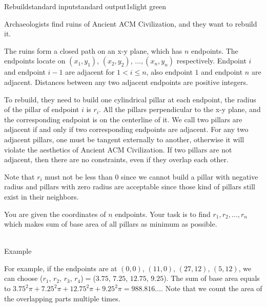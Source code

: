 \begin{problem}{Rebuild}{standard input}{standard output}{1s}{light green}

Archaeologists find ruins of Ancient ACM Civilization, and they want to rebuild it.

The ruins form a closed path on an x-y plane, which has $n$ endpoints.
The endpoints locate on $(x_1,y_1)$, $(x_2,y_2)$, $\ldots,(x_n,y_n)$ respectively.
Endpoint $i$ and endpoint $i-1$ are adjacent for $1<i\leq n$, also endpoint $1$ and endpoint $n$ are adjacent.
Distances between any two adjacent endpoints are positive integers.

To rebuild, they need to build one cylindrical pillar at each endpoint, the radius of the pillar of endpoint $i$ is $r_i$.
All the pillars perpendicular to the x-y plane, and the corresponding endpoint is on the centerline of it.
We call two pillars are adjacent if and only if two corresponding endpoints are adjacent.
For any two adjacent pillars, one must be tangent externally to another, 
otherwise it will violate the aesthetics of Ancient ACM Civilization.
If two pillars are not adjacent, then there are no constraints, even if they overlap each other.

Note that $r_i$ must not be less than $0$ since we cannot build a pillar with negative radius 
and pillars with zero radius are acceptable since those kind of pillars still exist in their neighbors.

You are given the coordinates of $n$ endpoints. Your task is to find $r_1,r_2,\ldots,r_n$ which makes sum of base area of all pillars as minimum as possible.

\def\ll{0.2}
\begin{center} \\
Example
\end{center}



For example, if the endpoints are at $(0,0)$, $(11,0)$, $(27,12)$, $(5,12)$, we can choose ($r_1$, $r_2$, $r_3$, $r_4$)$=$($3.75$, $7.25$, $12.75$, $9.25$).
The sum of base area equals to $3.75^2\pi+$$7.25^2\pi+12.75^2\pi+9.25^2\pi=988.816\ldots$. 
Note that we count the area of the overlapping parts multiple times.


\end{problem}

